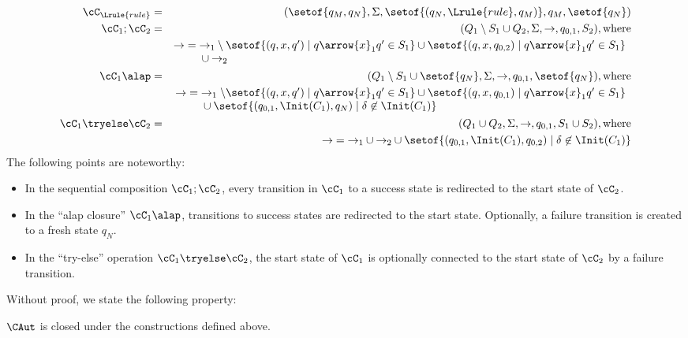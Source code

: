 \begin{eqnarray*}
\cC_{\Lrule{rule}} & =
   & ( \setof{q_M,q_N}, \Sigma, \setof{(q_N,\Lrule{rule},q_M)}, q_M, \setof{q_N}) \\
\cC_1;\cC_2 & =
   & (Q_{1} \setminus S_1 \cup Q_{2}, \Sigma, \rightarrow, q_{0,1}, S_2), \text{where} \\
  && {\rightarrow} =
         \begin{array}[t]{@{}l}
             {\rightarrow_{1}} \setminus \setof{(q,x,q') \mid q \arrow{x}_1 q' \in S_1}
               \cup \setof{ (q,x,q_{0,2}) \mid q \arrow{x}_1 q' \in S_1 } \\
             {} \cup {\rightarrow_{2}}
         \end{array} \\
\cC_1 \alap & =
   & (Q_1 \setminus S_1 \cup \setof{q_N}, \Sigma, \rightarrow, q_{0,1}, \setof{q_N}),
      \text{where} \\
  && {\rightarrow} =
         \begin{array}[t]{@{}l}
             \rightarrow_1 \setminus \setof{ (q,x,q') \mid q \arrow{x}_1 q' \in S_1}
	        \cup \setof{ (q,x,q_{0,1}) \mid q \arrow{x}_1 q' \in S_1 } \\
             {} \cup \setof{(q_{0,1},\Init(C_1),q_N) \mid \delta \not\in \Init(C_1)}
         \end{array} \\
\cC_1 \tryelse \cC_2 & =
   & (Q_1 \cup Q_2, \Sigma, \rightarrow, q_{0,1}, S_1 \cup S_2), \text{where} \\
  && {\rightarrow} = {\rightarrow_{1}} \cup {\rightarrow_{2}}
          \cup \setof{(q_{0,1},\Init(C_1),q_{0,2}) \mid \delta \not\in \Init(C_1) }
\end{eqnarray*}
%
The following points are noteworthy:
\begin{itemize}
\item In the sequential composition $\cC_1;\cC_2$, every transition in $\cC_1$
  to a success state is redirected to the start state of $\cC_2$.
\item In the ``alap closure'' $\cC_1\alap$, transitions to success states are
  redirected to the start state. Optionally, a failure transition is created to
  a fresh state $q_N$.
\item In the ``try-else'' operation $\cC_1\tryelse \cC_2$, the start state of
  $\cC_1$ is optionally connected to the start state of $\cC_2$ by a failure
  transition.
\end{itemize}
%
Without proof, we state the following property:
%
\begin{proposition}
$\CAut$ is closed under the constructions defined above.
\end{proposition}
